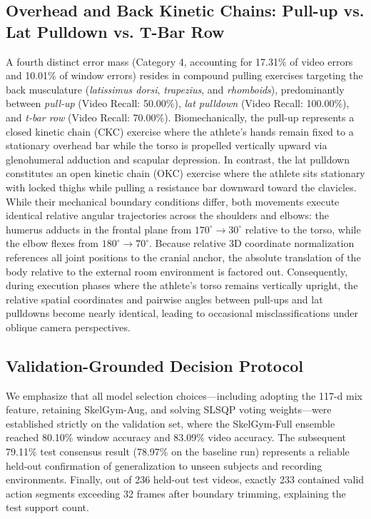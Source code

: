 \documentclass[preprint,12pt]{elsarticle}
\begin{document}
\subsection{Overhead and Back Kinetic Chains: Pull-up vs. Lat Pulldown vs. T-Bar Row}
A fourth distinct error mass (Category 4, accounting for 17.31\% of video errors and 10.01\% of window errors) resides in compound pulling exercises targeting the back musculature (\textit{latissimus dorsi}, \textit{trapezius}, and \textit{rhomboids}), predominantly between \textit{pull-up} (Video Recall: 50.00\%), \textit{lat pulldown} (Video Recall: 100.00\%), and \textit{t-bar row} (Video Recall: 70.00\%).
Biomechanically, the pull-up represents a closed kinetic chain (CKC) exercise where the athlete's hands remain fixed to a stationary overhead bar while the torso is propelled vertically upward via glenohumeral adduction and scapular depression. In contrast, the lat pulldown constitutes an open kinetic chain (OKC) exercise where the athlete sits stationary with locked thighs while pulling a resistance bar downward toward the clavicles. While their mechanical boundary conditions differ, both movements execute identical relative angular trajectories across the shoulders and elbows: the humerus adducts in the frontal plane from $170^\circ \to 30^\circ$ relative to the torso, while the elbow flexes from $180^\circ \to 70^\circ$. Because relative 3D coordinate normalization references all joint positions to the cranial anchor, the absolute translation of the body relative to the external room environment is factored out. Consequently, during execution phases where the athlete's torso remains vertically upright, the relative spatial coordinates and pairwise angles between pull-ups and lat pulldowns become nearly identical, leading to occasional misclassifications under oblique camera perspectives.

\subsection{Validation-Grounded Decision Protocol}\label{sec:val_protocol}
We emphasize that all model selection choices---including adopting the 117-d mix feature, retaining SkelGym-Aug, and solving SLSQP voting weights---were established strictly on the validation set, where the SkelGym-Full ensemble reached 80.10\% window accuracy and 83.09\% video accuracy. The subsequent 79.11\% test consensus result (78.97\% on the baseline run) represents a reliable held-out confirmation of generalization to unseen subjects and recording environments. Finally, out of 236 held-out test videos, exactly 233 contained valid action segments exceeding 32 frames after boundary trimming, explaining the test support count.
\end{document}
